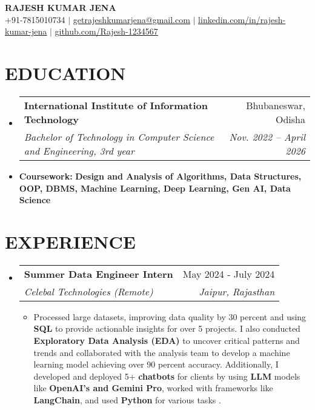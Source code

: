\documentclass[letterpaper,11pt]{article}
\makeatletter
\newcommand{\resumeItem}[1]{\item\small{#1 \vspace{-2pt}}}
\newcommand{\resumeSubheading}[4]{
  \vspace{-2pt}\item
    \begin{tabular*}{0.97\textwidth}[t]{l@{\extracolsep{\fill}}r}
      \textbf{#1} & #2 \\
      \textit{\small#3} & \textit{\small #4} \\
    \end{tabular*}\vspace{-7pt}
}
\newcommand{\resumeSubHeadingListStart}{\begin{itemize}[leftmargin=0.15in, label={}]}
\newcommand{\resumeSubHeadingListEnd}{\end{itemize}}
\newcommand{\resumeItemListStart}{\begin{itemize}}
\newcommand{\resumeItemListEnd}{\end{itemize}\vspace{-5pt}}
\makeatother
\begin{document}
\begin{center}
    \textbf{\Huge \scshape RAJESH KUMAR JENA} \\ \vspace{1pt}
    \small +91-7815010734 $|$ \href{mailto:getrajeshkumarjena@gmail.com}{\underline{getrajeshkumarjena@gmail.com}} $|$ 
    \href{https://linkedin.com/in/rajesh-kumar-jena}{\underline{linkedin.com/in/rajesh-kumar-jena}} $|$
    \href{https://github.com/Rajesh-1234567}{\underline{github.com/Rajesh-1234567}}
\end{center}

\section{\textbf{EDUCATION}}
\resumeSubHeadingListStart
    \resumeSubheading
      {International Institute of Information Technology}{Bhubaneswar, Odisha}
      {Bachelor of Technology in Computer Science and Engineering, 3rd year}{Nov. 2022 -- April 2026}
      \resumeItem{\textbf{Coursework:} \textbf{Design and Analysis of Algorithms, Data Structures, OOP, DBMS, Machine Learning, Deep Learning, Gen AI, Data Science}}
\resumeSubHeadingListEnd

\section{\textbf{EXPERIENCE}}
\resumeSubHeadingListStart
    \resumeSubheading
      {Summer Data Engineer Intern}{May 2024 - July 2024}
      {Celebal Technologies (Remote)}{Jaipur, Rajasthan}
      \resumeItemListStart
        \resumeItem{Processed large datasets, improving data quality by 30 percent and using \textbf{SQL} to provide actionable insights for over 5 projects. I also conducted \textbf{Exploratory Data Analysis (EDA)} to uncover critical patterns and trends and collaborated with the analysis team to develop a machine learning model achieving over 90 percent accuracy. Additionally, I developed and deployed 5+ \textbf{chatbots} for clients by using \textbf{LLM} models like \textbf{OpenAI's and Gemini Pro}, worked with frameworks like \textbf{LangChain}, and used \textbf{Python} for various tasks .}
      \resumeItemListEnd
\resumeSubHeadingListEnd

\end{document}
